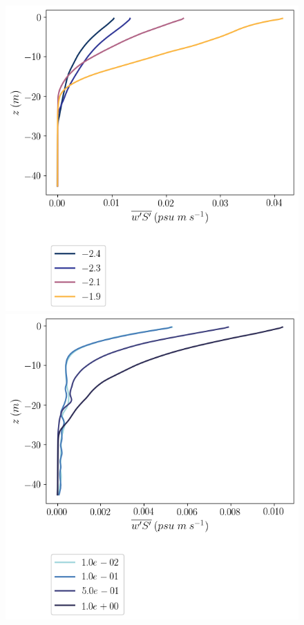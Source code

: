 \documentclass[draft,jgrga]{agutexSI2019}
\begin{document}
\begin{figure}[]
    \centering
    \begin{minipage}{0.5\textwidth}
        \includegraphics[trim={0 4cm 0 0},clip, width=\textwidth]{Figures/wsa_cmp_dT_43h_tav13_z_profile.png}
    \end{minipage}%
    \begin{minipage}{0.5\textwidth}
        \includegraphics[trim={0 4cm 0 0},clip, width=\textwidth]{Figures/wsa_cmp_dslope_43h_tav13_z_profile.png}

\end{minipage}
\end{figure}
\end{document}

